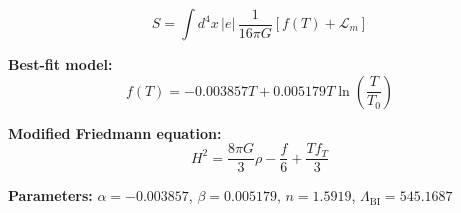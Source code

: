 
\begin{equation}
  S = \int d^4x \, |e| \, \frac{1}{16\pi G} \left[ f(T) + \mathcal{L}_m \right]
\end{equation}

\textbf{Best-fit model:}
\begin{equation}
  f(T) = -0.003857 T + 0.005179 T \ln\!\left(\frac{T}{T_0}\right)
\end{equation}

\textbf{Modified Friedmann equation:}
\begin{equation}
  H^2 = \frac{8\pi G}{3} \rho - \frac{f}{6} + \frac{T f_T}{3}
\end{equation}

\textbf{Parameters:}
$\alpha = -0.003857$, \quad
$\beta = 0.005179$, \quad
$n = 1.5919$, \quad
$\Lambda_{\text{BI}} = 545.1687$